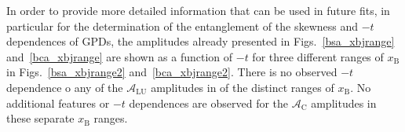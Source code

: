 In order to provide more detailed information that can be used in future fits, in particular for the determination of the entanglement of the skewness and $-t$ dependences of GPDs, the amplitudes already presented in Figs.~\ref{bsa_xbjrange} and~\ref{bca_xbjrange} are shown as a function of $-t$ for three different ranges of $x_{\textrm{B}}$ in Figs.~\ref{bsa_xbjrange2} and~\ref{bca_xbjrange2}. There is no observed $-t$ dependence o any of the $\mathcal{A}_{\textrm{LU}}$ amplitudes in  of the distinct ranges of $x_{\textrm{B}}$. No additional features or $-t$ dependences are observed for the $\mathcal{A}_{\textrm{C}}$ amplitudes in these separate $x_{\textrm{B}}$ ranges.
